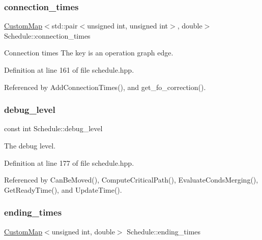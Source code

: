 \subsubsection{\texorpdfstring{connection\+\_\+times}{connection\_times}}
{\footnotesize\ttfamily \hyperlink{custom__map_8hpp_a18ca01763abbe3e5623223bfe5aaac6b}{Custom\+Map}$<$std\+::pair$<$unsigned int, unsigned int$>$, double$>$ Schedule\+::connection\+\_\+times\hspace{0.3cm}{\ttfamily [private]}}



Connection times The key is an operation graph edge. 



Definition at line 161 of file schedule.\+hpp.



Referenced by Add\+Connection\+Times(), and get\+\_\+fo\+\_\+correction().

\mbox{\label{classSchedule_a730ba60c8d53bd88d6a38c7bd005abd5}} 
\subsubsection{\texorpdfstring{debug\+\_\+level}{debug\_level}}
{\footnotesize\ttfamily const int Schedule\+::debug\+\_\+level\hspace{0.3cm}{\ttfamily [private]}}



The debug level. 



Definition at line 177 of file schedule.\+hpp.



Referenced by Can\+Be\+Moved(), Compute\+Critical\+Path(), Evaluate\+Conds\+Merging(), Get\+Ready\+Time(), and Update\+Time().

\mbox{\label{classSchedule_a572efad73e7017e5217bf0178084746a}} 
\subsubsection{\texorpdfstring{ending\+\_\+times}{ending\_times}}
{\footnotesize\ttfamily \hyperlink{custom__map_8hpp_a18ca01763abbe3e5623223bfe5aaac6b}{Custom\+Map}$<$unsigned int, double$>$ Schedule\+::ending\+\_\+times\hspace{0.3cm}{\ttfamily [private]}}



